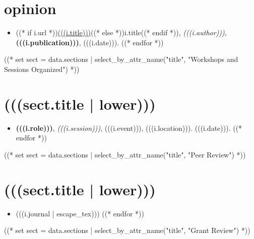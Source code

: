 \documentclass[10pt,oneside]{article}
\begin{document}
\section{opinion}

\mbox{}\vspace{-\dimexpr\baselineskip\relax}

\begin{itemize}[label={}]
  ((* for i in sect.entries.opinion | sort(attribute="date", reverse=True) *))
  \item ((* if i.url *))\href{(((i.url)))}{(((i.title)))}((* else *))i.title((* endif *)), \textit{(((i.author)))}, \textbf{(((i.publication)))}, (((i.date))).
        ((* endfor *))
\end{itemize}

((* set sect = data.sections | select_by_attr_name("title", "Workshops and Sessions Organized") *))
\section{(((sect.title | lower)))}

\mbox{}\vspace{-\dimexpr\baselineskip\relax}

\begin{itemize}[label={}]
  ((* for i in sect.entries.convene | sort(attribute="date", reverse=True) *))
  \item \textbf{(((i.role)))}, \textit{(((i.session)))}, (((i.event))), (((i.location))). (((i.date))).
        ((* endfor *))
\end{itemize}

((* set sect = data.sections | select_by_attr_name("title", "Peer Review") *))
\section{(((sect.title | lower)))}

\mbox{}\vspace{-\dimexpr\baselineskip\relax}

\begin{itemize}[label={}]
  ((* for i in sect.entries.peerreview | sort(attribute="journal") *))
  \item (((i.journal | escape_tex)))
        ((* endfor *))
\end{itemize}

((* set sect = data.sections | select_by_attr_name("title", "Grant Review") *))
\end{document}
